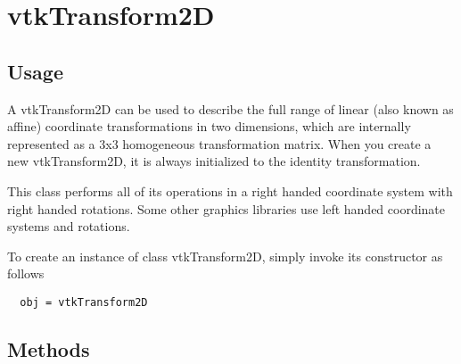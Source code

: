 \section{vtkTransform2D}

\subsection{Usage}

 A vtkTransform2D can be used to describe the full range of linear (also
 known as affine) coordinate transformations in two dimensions,
 which are internally represented as a 3x3 homogeneous transformation
 matrix.  When you create a new vtkTransform2D, it is always initialized
 to the identity transformation.

 This class performs all of its operations in a right handed
 coordinate system with right handed rotations. Some other graphics
 libraries use left handed coordinate systems and rotations.

To create an instance of class vtkTransform2D, simply
invoke its constructor as follows
\begin{verbatim}
  obj = vtkTransform2D
\end{verbatim}
\subsection{Methods}

